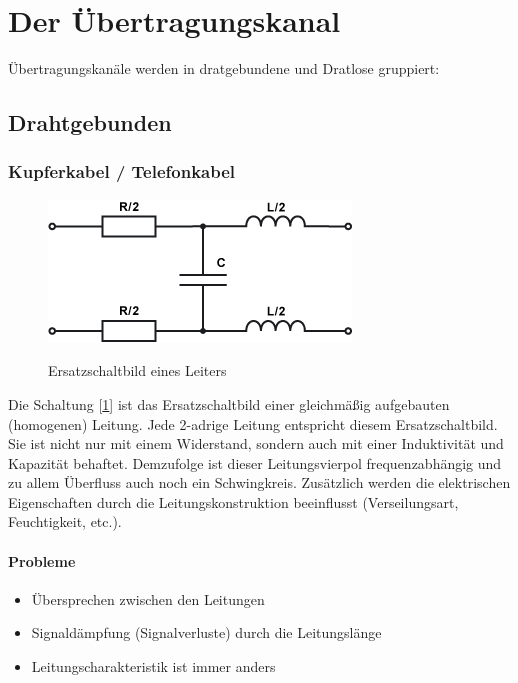 \documentclass[a4paper,10pt]{article}
\begin{document}
\newpage
\section{Der Übertragungskanal}

Übertragungskanäle werden in dratgebundene und Dratlose gruppiert:

\subsection{Drahtgebunden}


\subsubsection{Kupferkabel / Telefonkabel}

\begin{figure}[!htb]
\centering
\includegraphics[scale=0.5]{Kupferkabel.png}\\
\caption{Ersatzschaltbild eines Leiters}%
\label{kupferkabel}
\end{figure}

Die Schaltung [\ref{kupferkabel}] ist das Ersatzschaltbild einer gleichmäßig aufgebauten (homogenen) Leitung. Jede 2-adrige Leitung entspricht diesem Ersatzschaltbild.
Sie ist nicht nur mit einem Widerstand, sondern auch mit einer Induktivität und Kapazität behaftet. Demzufolge ist dieser Leitungsvierpol frequenzabhängig
und zu allem Überfluss auch noch ein Schwingkreis. Zusätzlich werden die elektrischen Eigenschaften durch die Leitungskonstruktion beeinflusst (Verseilungsart, Feuchtigkeit, etc.).
\paragraph{Probleme}
\begin{itemize}
  \item Übersprechen zwischen den Leitungen
  \item Signaldämpfung (Signalverluste) durch die Leitungslänge
  \item Leitungscharakteristik ist immer anders
\end{itemize}
\end{document}
